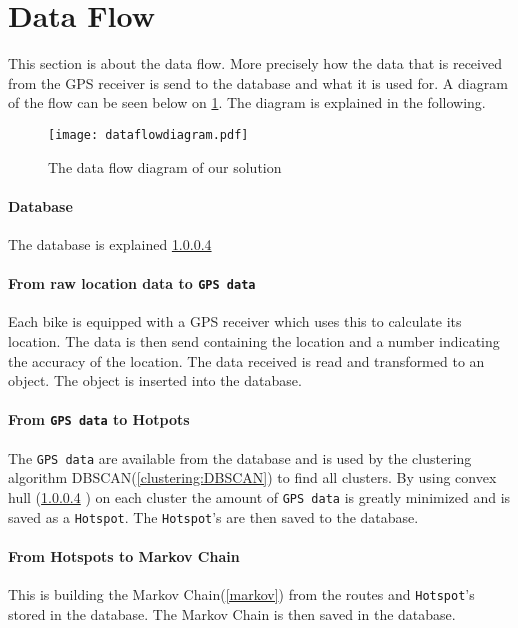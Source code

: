 \section{Data Flow}
This section is about the data flow. More precisely how the data that is received from the GPS receiver is send to the database and what it is used for.
A diagram of the flow can be seen below on \cref{fig:dataFlowDiagram}.
The diagram is explained in the following.

\begin{figure}[H]
\texttt{[image: dataflowdiagram.pdf]}
\caption{The data flow diagram of our solution}
\label{fig:dataFlowDiagram}
\end{figure}
\pagebreak

\paragraph{Database}
The database is explained \cref{} 

\paragraph{From raw location data to \texttt{GPS data}}
Each bike is equipped with a GPS receiver which uses this to calculate its location.
The data is then send containing the location and a number indicating the accuracy of the location.
The data received is read and transformed to an object.
The object is inserted into the database.

\paragraph{From \texttt{GPS data} to Hotpots}
The \texttt{GPS data} are available from the database and is used by the clustering algorithm DBSCAN(\cref{clustering:DBSCAN}) to find all clusters.
By using convex hull (\cref{} ) on each cluster the amount of \texttt{GPS data} is greatly minimized and is saved as a \texttt{Hotspot}.
The \texttt{Hotspot}'s are then saved to the database.

\paragraph{From Hotspots to Markov Chain}
This is building the Markov Chain(\cref{markov}) from the routes and \texttt{Hotspot}'s stored in the database.
The Markov Chain is then saved in the database.